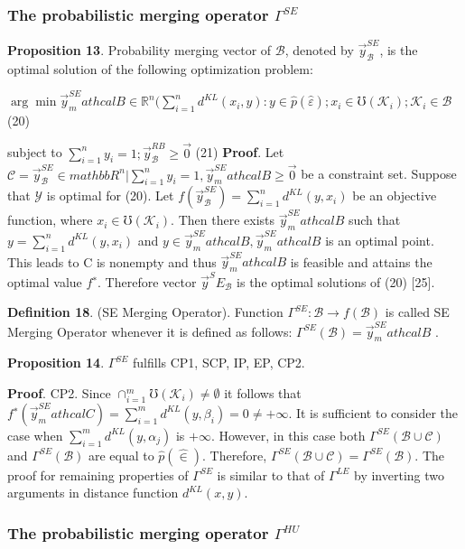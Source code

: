 \documentclass[10pt,a4paper]{IOS-Book-Article}
\begin{document}
\subsubsection{The probabilistic merging operator $\Gamma^{SE}$}

\textbf{Proposition 13}. Probability merging vector of $\mathcal{B}$,
denoted by $\vec{y}^{SE}_\mathcal{B}$, is the optimal solution of the following optimization problem:

$\arg \min\vec{y}^{SE}_mathcal{B} \in \mathbb{R}^n (
\sum^n_{i=1} d^{KL}(x_i, y) :
y \in \hat{p}(\hat{\varepsilon}); x_i \in \mho(\mathcal{K}_i);\mathcal{K}_i \in \mathcal{B}$ (20)

subject to $\sum^n_{i=1} y_i = 1; \vec{y}^{RB}_\mathcal{B}\geq\vec{0}$ (21)
\textbf{Proof}. Let $\mathcal{C} = {\vec{y}^{SE}_\mathcal{B} \in mathbb{R}^n|\sum^n_{i=1} y_i = 1, \vec{y}^{SE}_mathcal{B}\geq\vec{0}}$ 
be a constraint set. Suppose that $\mathcal{Y}$ is optimal for  
(20). Let $f(\vec{y}^{SE}_\mathcal{B})= \sum^n_{i=1} d^{KL}(y, x_i)$ be an objective function, 
where $x_i \in \mho(\mathcal{K}_i)$. Then there exists $\vec{y}^{SE}_mathcal{B}$ 
such that $y = \sum^n_{i=1} d^{KL}(y, x_i)$ and $y \in \vec{y}^{SE}_mathcal{B} ,\vec{y}^{SE}_mathcal{B}$ is 
an optimal point. This leads to C is nonempty and 
thus $\vec{y}^{SE}_mathcal{B}$ is feasible and attains the optimal value $f^∗$. 
Therefore vector $\vec{y}^SE_\mathcal{B}$ is the optimal solutions of (20) 
[25]. 

\textbf{Definition 18}. (SE Merging Operator). Function 
$\Gamma^{SE} : \mathcal{B} \to f(\mathcal{B})$ is called SE Merging Operator 
whenever it is defined as follows: 
$\Gamma^{SE}(\mathcal{B}) = \vec{y}^{SE}_mathcal{B}$ . 

\textbf{Proposition 14}. 
$\Gamma^{SE}$ fulfills CP1, SCP, IP, EP, CP2. 

\textbf{Proof}. CP2. Since $\cap^m_{i=1}\mho(\mathcal{K}_i) \neq \emptyset$ it follows that 
$f^∗(\vec{y}^{SE}_mathcal{C} ) = \sum^m_{i=1} d^{KL}(y, \beta_i) = 0 \neq +\infty$. It is sufficient 
to consider the case when $\sum^m_{i=1} d^{KL}(y, \alpha_j)$ 
is $+\infty$. However, in this case both $\Gamma^{SE}(\mathcal{B} \cup \mathcal{C})$ and 
$\Gamma^{SE}(\mathcal{B})$ are equal to $\hat{p}(\hat{\in})$. Therefore, $\Gamma^{SE}(\mathcal{B} \cup \mathcal{C}) = 
\Gamma^{SE}(\mathcal{B})$. The proof for remaining properties of $\Gamma^{SE}$ 
is similar to that of $\Gamma^{LE}$ by inverting two arguments 
in distance function $d^{KL}(x, y)$.

\subsubsection{The probabilistic merging operator $\Gamma^{HU}$}
\end{document}
